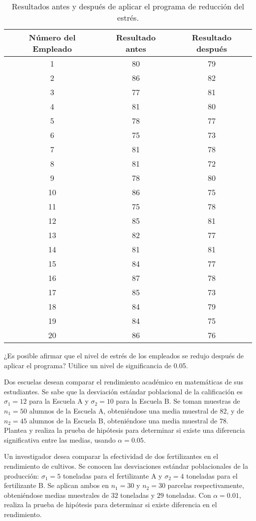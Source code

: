 \documentclass[addpoints,12pt]{exam}
\theoremstyle{plain}
\theoremstyle{remark}
\theoremstyle{definition}
\begin{document}
\begin{questions}
\begin{table}[H] \centering \begin{tabular}{|c|c|c|} \hline \textbf{Número del Empleado} & \textbf{Resultado antes} & \textbf{Resultado después} \\ \hline 1 & 80 & 79 \\ \hline 2 & 86 & 82 \\ \hline 3 & 77 & 81 \\ \hline 4 & 81 & 80 \\ \hline 5 & 78 & 77 \\ \hline 6 & 75 & 73 \\ \hline 7 & 81 & 78 \\ \hline 8 & 81 & 72 \\ \hline 9 & 78 & 80 \\ \hline 10 & 86 & 75 \\ \hline 11 & 75 & 78 \\ \hline 12 & 85 & 81 \\ \hline 13 & 82 & 77 \\ \hline 14 & 81 & 81 \\ \hline 15 & 84 & 77 \\ \hline 16 & 87 & 78 \\ \hline 17 & 85 & 73 \\ \hline 18 & 84 & 79 \\ \hline 19 & 84 & 75 \\ \hline 20 & 86 & 76 \\ \hline \end{tabular} \caption{Resultados antes y después de aplicar el programa de reducción del estrés.} \label{table:resultados} \end{table}

¿Es posible afirmar que el nivel de estrés de los empleados se redujo después de aplicar el programa? Utilice un nivel de significancia de 0.05.

 \question  Dos escuelas desean comparar el rendimiento académico en matemáticas de sus estudiantes. Se sabe que la desviación estándar poblacional de la calificación es \( \sigma_1 = 12 \) para la Escuela A y \( \sigma_2 = 10 \) para la Escuela B. Se toman muestras de \( n_1 = 50 \) alumnos de la Escuela A, obteniéndose una media muestral de \(82\), y de \( n_2 = 45 \) alumnos de la Escuela B, obteniéndose una media muestral de \(78\). Plantea y realiza la prueba de hipótesis para determinar si existe una diferencia significativa entre las medias, usando \(\alpha = 0.05\).

 \question Un investigador desea comparar la efectividad de dos fertilizantes en el rendimiento de cultivos. Se conocen las desviaciones estándar poblacionales de la producción: \( \sigma_1 = 5 \) toneladas para el fertilizante A y \( \sigma_2 = 4 \) toneladas para el fertilizante B. Se aplican ambos en \( n_1 = 30 \) y \( n_2 = 30 \) parcelas respectivamente, obteniéndose medias muestrales de \(32\) toneladas y \(29\) toneladas. Con \(\alpha = 0.01\), realiza la prueba de hipótesis para determinar si existe diferencia en el rendimiento.


\end{questions}
\end{document}
